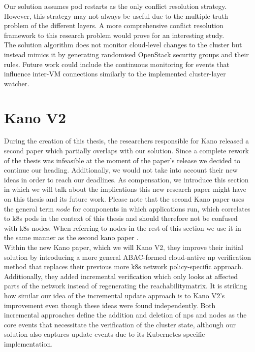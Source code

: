 Our solution assumes pod restarts as the only conflict resolution strategy. However, this strategy may not always be useful due to the multiple-truth problem of the different layers. A more comprehensive conflict resolution framework to this research problem would prove for an interesting study.
\\[10pt]

The solution algorithm does not monitor cloud-level changes to the cluster but instead mimics it by generating randomised OpenStack security groups and their rules. Future work could include the continuous monitoring for events that influence inter-VM connections similarly to the implemented cluster-layer watcher.
\\[10pt]




\section{Kano V2} \label{sec:kanov2}
During the creation of this thesis, the researchers responsible for Kano released a second paper which partially overlaps with our solution.  Since a complete rework of the thesis was infeasible at the moment of the paper's release we decided to continue our heading. Additionally, we would not take into account their new ideas in order to reach our deadlines. As compensation, we introduce this section in which we will talk about the implications this new research paper might have on this thesis and its future work. Please note that the second Kano paper uses the general term $node$ for components in which applications run, which correlates to \acrshort{k8s} pods in the context of this thesis and should therefore not be confused with \acrshort{k8s} nodes. When referring to nodes in the rest of this section we use it in the same manner as the second kano paper \cite{kano2}.
\\[10pt]

Within the new Kano paper, which we will Kano V2, they improve their initial solution by introducing a more general ABAC-formed cloud-native \acrshort{np} verification method that replaces their previous more \acrshort{k8s} network policy-specific approach. Additionally, they added incremental verification which only looks at affected parts of the network instead of regenerating the reachabilitymatrix. It is striking how similar our idea of the incremental update approach is to Kano V2's improvement even though these ideas were found independently. Both incremental approaches define the addition and deletion of \acrshort{np}s and nodes as the core events that necessitate the verification of the cluster state, although our solution also captures update events due to its Kubernetes-specific implementation.
\\[10pt]

